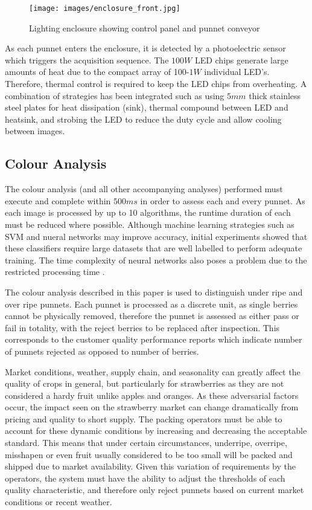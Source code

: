 \documentclass{bmvc2k}
\begin{document}
\begin{figure}[h]
	\centering
	\texttt{[image: images/enclosure\_front.jpg]}
	\caption{Lighting enclosure showing control panel and punnet conveyor}
	\label{fig:enclosure_front}
\end{figure}


As each punnet enters the enclosure, it is detected by a photoelectric sensor which triggers the acquisition sequence. The $100W$ LED chips generate large amounts of heat due to the compact array of 100-$1W$ individual LED's. Therefore, thermal control is required to keep the LED chips from overheating. A combination of strategies has been integrated such as using $5mm$ thick stainless steel plates for heat dissipation (sink), thermal compound between LED and heatsink, and strobing the LED to reduce the duty cycle and allow cooling between images.   



\subsection{Colour Analysis}
\label{sec:colour_analysis}

The colour analysis (and all other accompanying analyses) performed must execute and complete within $500ms$ in order to assess each and every punnet. As each image is processed by up to 10 algorithms, the runtime duration of each must be reduced where possible. Although machine learning strategies such as SVM and nueral networks may improve accuracy, initial experiments showed that these classifiers require large datasets that are well labelled to perform adequate training. The time complexity of neural networks also poses a problem due to the restricted processing time \cite{he}\cite{angiulli}. 

The colour analysis described in this paper is used to distinguish under ripe and over ripe punnets. Each punnet is processed as a discrete unit, as single berries cannot be physically removed, therefore the punnet is assessed as either pass or fail in totality, with the reject berries to be replaced after inspection. This corresponds to the customer quality performance reports which indicate number of punnets rejected as opposed to number of berries. 

Market conditions, weather, supply chain, and seasonality can greatly affect the quality of crops in general, but particularly for strawberries as they are not considered a hardy fruit unlike apples and oranges. As these adversarial factors occur, the impact seen on the strawberry market can change dramatically from pricing and quality to short supply. The packing operators must be able to account for these dynamic conditions by increasing and decreasing the acceptable standard. This means that under certain circumstances, underripe, overripe, misshapen or even fruit usually considered to be too small will be packed and shipped due to market availability. Given this variation of requirements by the operators, the system must have the ability to adjust the thresholds of each quality characteristic, and therefore only reject punnets based on current market conditions or recent weather. 
\end{document}
